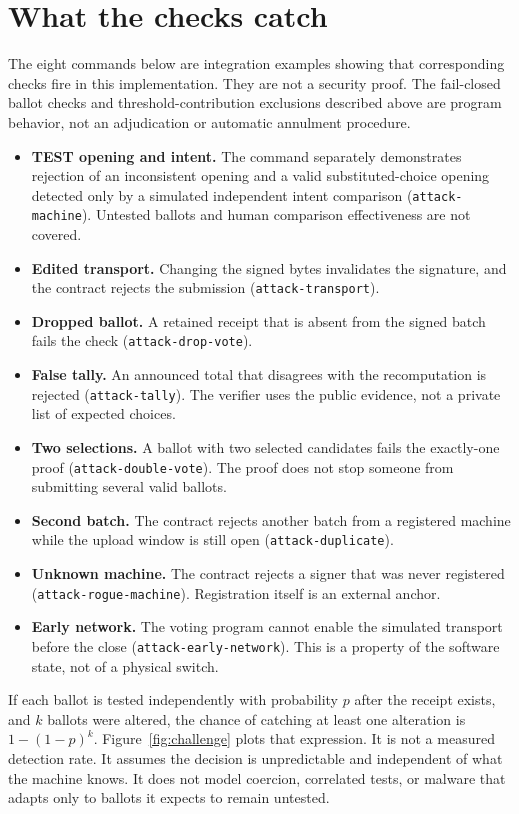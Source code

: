 \documentclass[11pt]{article}
\newcommand{\attack}[1]{\texttt{attack-}\allowbreak\texttt{#1}}
\begin{document}
\section{What the checks catch}
The eight commands below are integration examples showing that corresponding checks fire in this implementation. They are not a security proof. The fail-closed ballot checks and threshold-contribution exclusions described above are program behavior, not an adjudication or automatic annulment procedure.

\begin{itemize}
\item \textbf{TEST opening and intent.} The command separately demonstrates rejection of an inconsistent opening and a valid substituted-choice opening detected only by a simulated independent intent comparison (\attack{machine}). Untested ballots and human comparison effectiveness are not covered.
\item \textbf{Edited transport.} Changing the signed bytes invalidates the signature, and the contract rejects the submission (\attack{transport}).
\item \textbf{Dropped ballot.} A retained receipt that is absent from the signed batch fails the check (\attack{drop-vote}).
\item \textbf{False tally.} An announced total that disagrees with the recomputation is rejected (\attack{tally}). The verifier uses the public evidence, not a private list of expected choices.
\item \textbf{Two selections.} A ballot with two selected candidates fails the exactly-one proof (\attack{double-vote}). The proof does not stop someone from submitting several valid ballots.
\item \textbf{Second batch.} The contract rejects another batch from a registered machine while the upload window is still open (\attack{duplicate}).
\item \textbf{Unknown machine.} The contract rejects a signer that was never registered (\attack{rogue-machine}). Registration itself is an external anchor.
\item \textbf{Early network.} The voting program cannot enable the simulated transport before the close (\attack{early-network}). This is a property of the software state, not of a physical switch.
\end{itemize}

If each ballot is tested independently with probability $p$ after the receipt exists, and $k$ ballots were altered, the chance of catching at least one alteration is $1-(1-p)^k$. Figure~\ref{fig:challenge} plots that expression. It is not a measured detection rate. It assumes the decision is unpredictable and independent of what the machine knows. It does not model coercion, correlated tests, or malware that adapts only to ballots it expects to remain untested.
\end{document}
